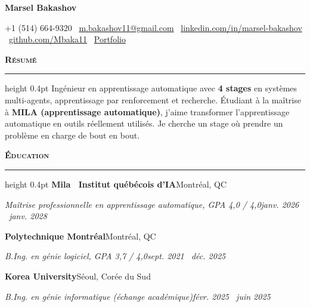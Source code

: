 \documentclass[letterpaper,11pt]{article}
\newcommand{\sep}{\textbar\ }
\newlength{\cvindent}\setlength{\cvindent}{7pt}
\newcommand{\cvsection}[1]{\vspace{9pt}\noindent\textbf{\textsc{#1}}\par\nointerlineskip\vspace{3pt}\hrule height 0.4pt\vspace{7pt}}
\newcommand{\cvrowin}[2]{\noindent\hspace{\cvindent}#1\hfill #2\hspace{\cvindent}\par}
\begin{document}
\fontsize{10.5}{12.6}\selectfont

\begin{center}
  {\fontsize{26}{28}\selectfont\textbf{Marsel Bakashov}}\par\vspace{2pt}
  {\small +1 (514) 664-9320 \sep \href{mailto:m.bakashov11@gmail.com}{m.bakashov11@gmail.com} \sep \href{https://www.linkedin.com/in/marsel-bakashov-813643213/}{linkedin.com/in/marsel-bakashov} \sep \href{https://github.com/Mbaka11}{github.com/Mbaka11} \sep \href{https://marselbak.netlify.app/}{Portfolio}}
\end{center}
\vspace{-8pt}

\cvsection{Résumé}
Ingénieur en apprentissage automatique avec \textbf{4 stages} en systèmes multi-agents, apprentissage par renforcement et recherche. Étudiant à la maîtrise à \textbf{MILA (apprentissage automatique)}, j'aime transformer l'apprentissage automatique en outils réellement utilisés. Je cherche un stage où prendre un problème en charge de bout en bout.

\cvsection{Éducation}
\cvrowin{\textbf{Mila \textendash\ Institut québécois d'IA}}{Montréal, QC}
\cvrowin{\textit{Maîtrise professionnelle en apprentissage automatique, GPA 4,0 / 4,0}}{\textit{janv. 2026 \textendash\ janv. 2028}}
\cvrowin{\textbf{Polytechnique Montréal}}{Montréal, QC}
\cvrowin{\textit{B.Ing. en génie logiciel, GPA 3,7 / 4,0}}{\textit{sept. 2021 \textendash\ déc. 2025}}
\cvrowin{\textbf{Korea University}}{Séoul, Corée du Sud}
\cvrowin{\textit{B.Ing. en génie informatique (échange académique)}}{\textit{févr. 2025 \textendash\ juin 2025}}
\end{document}
